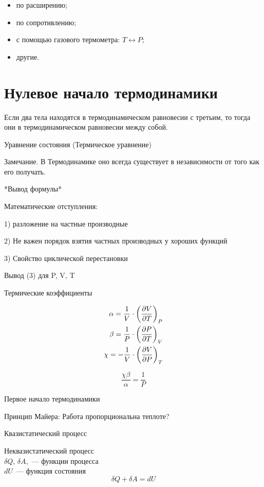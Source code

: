 \documentclass[../main.tex]{subfiles}
\begin{document}
    \begin{itemize}
        \item по расширению;
        \item по сопротивлению;
        \item с помощью газового термометра: $T \leftrightarrow P$;
        \item другие.
    \end{itemize}

    \section{Нулевое начало термодинамики}

    \begin{proposition}
        Если два тела находятся в термодинамическом равновесии с третьим, то тогда они в термодинамическом равновесии между собой.
    \end{proposition}
    
    Уравнение состояния (Термическое уравнение)

    Замечание. В Термодинамике оно всегда существует в независимости от того как его получать.

    *Вывод формулы*

    Математические отступления:

        1) разложение на частные производные

        2) Не важен порядок взятия частных производных у хороших функций

        3) Свойство циклической перестановки

    Вывод (3) для P, V, T

    Термические коэффициенты

    \begin{eqnarray}
        \alpha  =   \frac{1}{V} \cdot \left(\frac{\partial V}{\partial T}\right)_{P} \\
        \beta   =   \frac{1}{P} \cdot \left(\frac{\partial P}{\partial T}\right)_{V} \\
        \chi    = - \frac{1}{V} \cdot \left(\frac{\partial V}{\partial P}\right)_{T}
    \end{eqnarray}

    \begin{equation}
        \frac{\chi \beta}{\alpha} = \frac{1}{P}
    \end{equation}

    Первое начало термодинамики 

    Принцип Майера: Работа пропорциональна теплоте?

    Квазистатический процесс

    Неквазистатический процесс\\
    $\delta Q$, $\delta A$,~--- функции процесса\\
    $dU$~--- функция состояния\\

    $$ \delta Q + \delta A = dU$$
\end{document}
